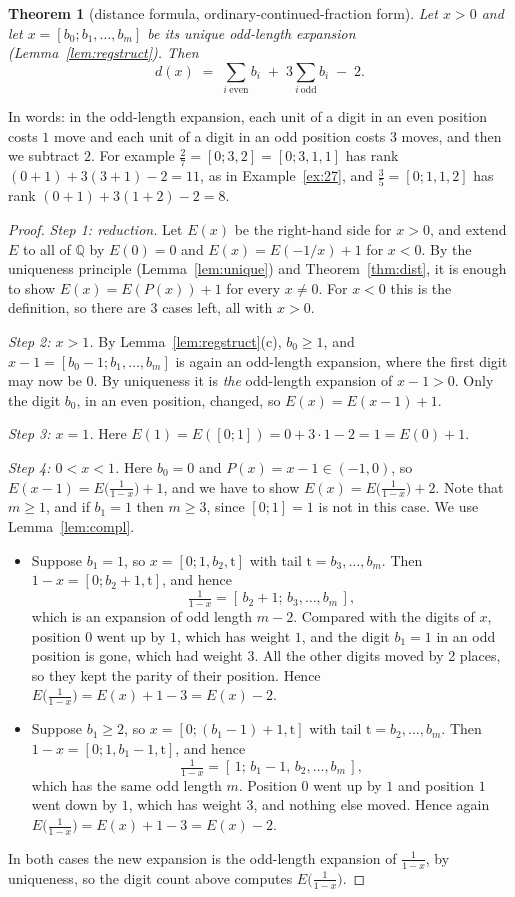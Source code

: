 \documentclass[11pt]{article}
\newtheorem{theorem}{Theorem}[section]
\theoremstyle{definition}
\theoremstyle{remark}
\newcommand{\Q}{\mathbb{Q}}
\begin{document}
\begin{theorem}[distance formula, ordinary-continued-fraction form]\label{thm:reg}
Let $x>0$ and let $x=[b_0;b_1,\dots,b_m]$ be its unique odd-length expansion
(Lemma~\ref{lem:regstruct}). Then
\[
d(x)\;=\;\sum_{i\ \mathrm{even}} b_i\;+\;3\sum_{i\ \mathrm{odd}} b_i\;-\;2 .
\]
\end{theorem}

In words: in the odd-length expansion, each unit of a digit in an even position costs $1$ move and
each unit of a digit in an odd position costs $3$ moves, and then we subtract $2$. For example
$\tfrac27=[0;3,2]=[0;3,1,1]$ has rank $(0+1)+3(3+1)-2=11$, as in Example~\ref{ex:27}, and
$\tfrac35=[0;1,1,2]$ has rank $(0+1)+3(1+2)-2=8$.

\begin{proof}
\emph{Step 1: reduction.} Let $E(x)$ be the right-hand side for $x>0$, and extend $E$ to all of
$\Q$ by $E(0)=0$ and $E(x)=E(-1/x)+1$ for $x<0$. By the uniqueness principle
(Lemma~\ref{lem:unique}) and Theorem~\ref{thm:dist}, it is enough to show $E(x)=E(P(x))+1$ for
every $x\neq0$. For $x<0$ this is the definition, so there are 3 cases left, all with $x>0$.

\emph{Step 2: $x>1$.} By Lemma~\ref{lem:regstruct}(c), $b_0\ge1$, and $x-1=[b_0-1;b_1,\dots,b_m]$
is again an odd-length expansion, where the first digit may now be $0$. By uniqueness it is
\emph{the} odd-length expansion of $x-1>0$. Only the digit $b_0$, in an even position, changed, so
$E(x)=E(x-1)+1$.

\emph{Step 3: $x=1$.} Here $E(1)=E([0;1])=0+3\cdot1-2=1=E(0)+1$.

\emph{Step 4: $0<x<1$.} Here $b_0=0$ and $P(x)=x-1\in(-1,0)$, so $E(x-1)=E\bigl(\tfrac{1}{1-x}\bigr)+1$,
and we have to show $E(x)=E\bigl(\tfrac{1}{1-x}\bigr)+2$. Note that $m\ge1$, and if $b_1=1$ then
$m\ge3$, since $[0;1]=1$ is not in this case. We use Lemma~\ref{lem:compl}.
\begin{itemize}[itemsep=1pt,topsep=2pt]
\item Suppose $b_1=1$, so $x=[0;1,b_2,\mathrm{t}]$ with tail $\mathrm{t}=b_3,\dots,b_m$. Then
$1-x=[0;b_2+1,\mathrm{t}]$, and hence
\[
\tfrac{1}{1-x}=[\,b_2+1;\,b_3,\dots,b_m\,],
\]
which is an expansion of odd length $m-2$. Compared with the digits of $x$, position $0$ went up by
$1$, which has weight $1$, and the digit $b_1=1$ in an odd position is gone, which had weight $3$.
All the other digits moved by 2 places, so they kept the parity of their position. Hence
$E\bigl(\tfrac1{1-x}\bigr)=E(x)+1-3=E(x)-2$.
\item Suppose $b_1\ge2$, so $x=[0;(b_1-1)+1,\mathrm{t}]$ with tail $\mathrm{t}=b_2,\dots,b_m$. Then
$1-x=[0;1,b_1-1,\mathrm{t}]$, and hence
\[
\tfrac{1}{1-x}=[\,1;\,b_1-1,\,b_2,\dots,b_m\,],
\]
which has the same odd length $m$. Position $0$ went up by $1$ and position $1$ went down by $1$,
which has weight $3$, and nothing else moved. Hence again $E\bigl(\tfrac1{1-x}\bigr)=E(x)+1-3=E(x)-2$.
\end{itemize}
In both cases the new expansion is the odd-length expansion of $\tfrac1{1-x}$, by uniqueness, so
the digit count above computes $E\bigl(\tfrac1{1-x}\bigr)$.
\end{proof}
\end{document}
